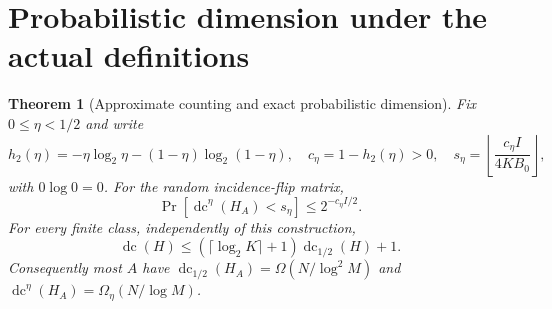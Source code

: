 \documentclass[11pt]{article}
\newtheorem{theorem}{Theorem}
\DeclareMathOperator{\dc}{dc}
\newcommand{\1}{\mathbf 1}
\begin{document}
\section{Probabilistic dimension under the actual definitions}
\begin{theorem}[Approximate counting and exact probabilistic dimension]\label{thm:prob}
Fix $0\le\eta<1/2$ and write
\[
 h_2(\eta)=-\eta\log_2\eta-(1-\eta)\log_2(1-\eta),\quad
 c_\eta=1-h_2(\eta)>0,
 \quad s_\eta=\left\lfloor\frac{c_\eta I}{4KB_0}\right\rfloor,
\]
with $0\log 0=0$. For the random incidence-flip matrix,
\begin{equation}\label{eq:approx-prob}
 \Pr[\dc^\eta(H_A)<s_\eta]\le2^{-c_\eta I/2}.
\end{equation}
For every finite class, independently of this construction,
\begin{equation}\label{eq:exact-prob}
 \dc(H)\le(\lceil\log_2 K\rceil+1)\dc_{1/2}(H)+1.
\end{equation}
Consequently most $A$ have $\dc_{1/2}(H_A)=\Omega(N/\log^2M)$ and $\dc^\eta(H_A)=\Omega_\eta(N/\log M)$.
\end{theorem}
\end{document}
